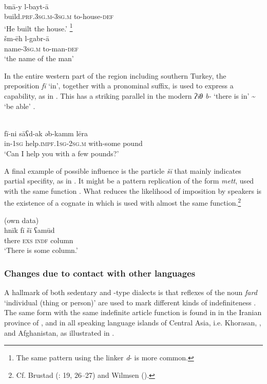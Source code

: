 \documentclass[output=paper]{langsci/langscibook}
\begin{document}
\ea \label{rubin}
\ea
{ \citep[100]{Rubin2005}}\\
\gll bnā-y l-bayt-ā\\
     build.\textsc{prf.3sg.m}{}-3\textsc{sg.m} to-house-\textsc{def}\\
     \glt ‘He built the house.’
\ex
{  \citep[29]{Hopkins1997}\footnote{The same pattern using the linker \textit{d}{}- is more common.}}\\
\gll šm-ēh l-gabr-ā\\
     name-3\textsc{sg.m} to-man-\textsc{def}\\
\glt ‘the name of the man’
\z
\z

In the entire western part of the region including southern Turkey, the {preposition} \textit{fī} ‘in’, together with a pronominal suffix, is used to express a capability, as in . This has a striking parallel in the modern  \textit{ʔīθ} \textit{b-} ‘there is in' {\textasciitilde} `be able’ \citep[52]{Borg2004}.

\ea \label{cowell}
{ \citep[415]{Cowell1964}} \\
\gll fī-ni sāʕd-ak əb-kamm lēra\\
     in-\textsc{1sg} help.\textsc{impf.1sg-2sg.m} with-some pound \\
\glt ‘Can I help you with a few pounds?’
\z

A final example of possible  influence is the  particle \textit{šī} that mainly indicates partial specifity, as in . It might be a pattern {replication} of the  form \textit{mett}, used with the same function \citep[49]{Diem1979}. What reduces the likelihood of {imposition} by  speakers is the existence of a {cognate} in  which is used with almost the same function.\footnote{Cf. Brustad (\citeyear{Brustad2000}: 19, 26--27) and Wilmsen (\citeyear[51--53]{Wilmsen2014}).}

\ea\label{shi} 
{ (own data)}\\
\gll hnīk fī šī ʕamūd\\
     there \textsc{exs} \textsc{indf} column \\
\glt ‘There is some column.’
\z

\subsubsection{Changes due to contact with other languages}
A hallmark of both sedentary and -type  dialects is that reflexes of the noun \textit{fard} ‘individual (thing or person)’ are used to mark different kinds of indefiniteness \citep[118--119]{Blanc1964}. The same form with the same {indefinite article} function is found in in the Iranian province of , and in all  speaking language islands of Central Asia, i.e. Khorasan, , and Afghanistan, as illustrated in .
\end{document}
